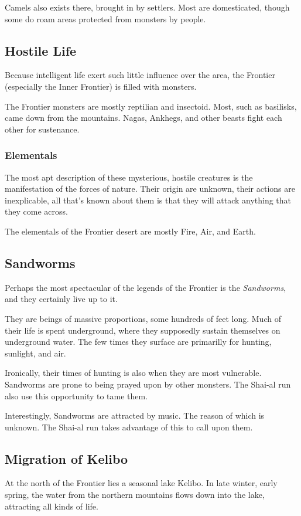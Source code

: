 \documentclass[../main.tex]{subfiles}
\begin{document}
Camels also exists there, brought in by settlers. Most are domesticated,
though some do roam areas protected from monsters by people.

\subsection{Hostile Life}
Because intelligent life exert such little influence over the area, the
Frontier (especially the Inner Frontier) is filled with monsters.

The Frontier monsters are mostly reptilian and insectoid.
Most, such as basilisks, came down from the mountains. Nagas,
Ankhegs, and other beasts fight each other for sustenance.

\subsubsection{Elementals}
The most apt description of these mysterious, hostile creatures is
the manifestation of the forces of nature. Their origin are unknown,
their actions are inexplicable, all that's known about them is that
they will attack anything that they come across.

The elementals of the Frontier desert are mostly Fire, Air, and Earth.

\subsection{Sandworms}
Perhaps the most spectacular of the legends of the Frontier is the \emph{Sandworms},
and they certainly live up to it.

They are beings of massive proportions, some hundreds of feet long.
Much of their life is spent underground, where they supposedly
sustain themselves on underground water. The few times they surface
are primarilly for hunting, sunlight, and air.

Ironically, their times of hunting is also when they are most
vulnerable. Sandworms are prone to being prayed upon by other monsters.
The Shai-al run also use this opportunity to tame them.

Interestingly, Sandworms are attracted by music. The reason of which is
unknown. The Shai-al run takes advantage of this to call upon them.

\subsection{Migration of Kelibo}
At the north of the Frontier lies a seasonal lake Kelibo. In late winter,
early spring, the water from the northern mountains flows down into the
lake, attracting all kinds of life.
\end{document}
